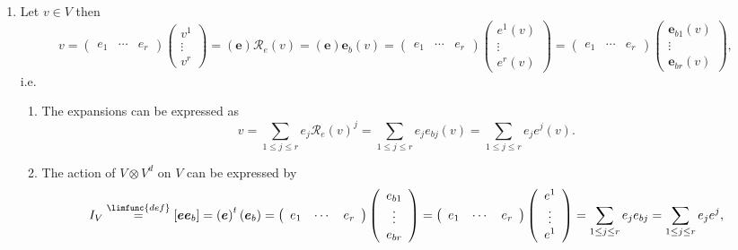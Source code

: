 \documentclass[aps,preprint]{revtex4}
\begin{document}
\begin{enumerate}
\item Let $v\in V$ then 
\begin{equation}
v=\left( 
\begin{array}{ccc}
e_{1} & \cdots & e_{r}%
\end{array}%
\right) \left( 
\begin{array}{c}
v^{1} \\ 
\vdots \\ 
v^{r}%
\end{array}%
\right) =\left( \boldsymbol{e}\right) \mathcal{R}_{e}\left( v\right) =\left( 
\boldsymbol{e}\right) \boldsymbol{e}_{b}\left( v\right) =\left( 
\begin{array}{ccc}
e_{1} & \cdots & e_{r}%
\end{array}%
\right) \left( 
\begin{array}{c}
e^{1}\left( v\right) \\ 
\vdots \\ 
e^{r}\left( v\right)%
\end{array}%
\right) =\left( 
\begin{array}{ccc}
e_{1} & \cdots & e_{r}%
\end{array}%
\right) \left( 
\begin{array}{c}
\boldsymbol{e}_{b1}\left( v\right) \\ 
\vdots \\ 
\boldsymbol{e}_{br}\left( v\right)%
\end{array}%
\right) ,
\end{equation}%
i.e.

\begin{enumerate}
\item The expansions can be expressed as 
\begin{equation}
v=\sum_{1\leq j\leq r}e_{j}\mathcal{R}_{e}\left( v\right) ^{j}=\sum_{1\leq
j\leq r}e_{j}e_{bj}\left( v\right) =\sum_{1\leq j\leq r}e_{j}e^{j}\left(
v\right) .
\end{equation}

\item The action of $V\otimes V^{d}$ on $V$ can be expressed by 
\begin{equation}
I_{V}\overset{\limfunc{def}}{=}\left[ \boldsymbol{ee}_{b}\right] =\left( 
\boldsymbol{e}\right) ^{t}\left( \boldsymbol{e}_{b}\right) =\left( 
\begin{array}{ccc}
e_{1} & \cdots & e_{r}%
\end{array}%
\right) \left( 
\begin{array}{c}
e_{b1} \\ 
\vdots \\ 
e_{br}%
\end{array}%
\right) =\left( 
\begin{array}{ccc}
e_{1} & \cdots & e_{r}%
\end{array}%
\right) \left( 
\begin{array}{c}
e^{1} \\ 
\vdots \\ 
e^{1}%
\end{array}%
\right) =\sum_{1\leq j\leq r}e_{j}e_{bj}=\sum_{1\leq j\leq r}e_{j}e^{j},
\end{equation}


\end{enumerate}
\end{enumerate}
\end{document}
